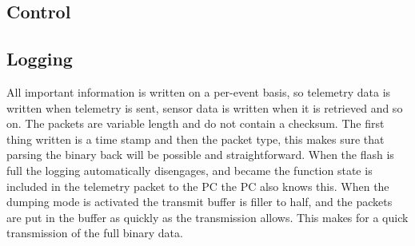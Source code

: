 \documentclass[final]{article}
\begin{document}
\subsection{Control}

\subsection{Logging}
All important information is written on a per-event basis, so telemetry data is written when telemetry is sent, sensor data is written when it is retrieved and so on.
The packets are variable length and do not contain a checksum.
The first thing written is a time stamp and then the packet type, this makes sure that parsing the binary back will be possible and straightforward.
When the flash is full the logging automatically disengages, and became the function state is included in the telemetry packet to the PC the PC also knows this.
When the dumping mode is activated the transmit buffer is filler to half, and the packets are put in the buffer as quickly as the transmission allows.
This makes for a quick transmission of the full binary data.
\end{document}
